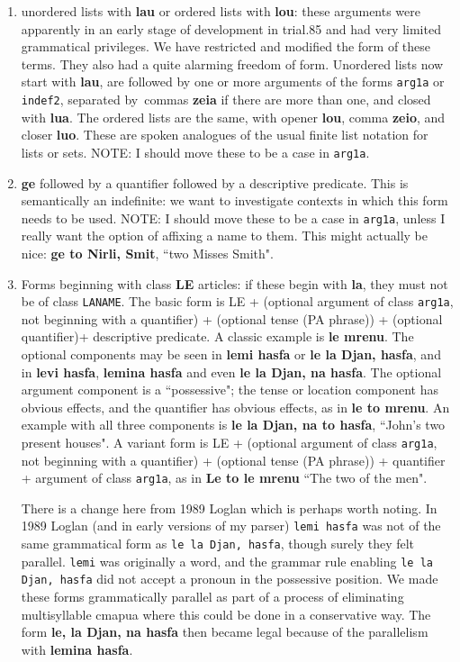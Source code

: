 \documentclass[12pt]{book}
\begin{document}
\begin{enumerate}

\item unordered lists with {\bf lau} or ordered lists with {\bf lou}:   these arguments were apparently in an early stage of development in trial.85 and had very limited grammatical privileges.  We have restricted and modified the form of these terms.  They also had a quite alarming freedom of form.  Unordered lists now start with {\bf lau}, are followed by one or more arguments of the forms {\tt arg1a} or {\tt indef2}, separated by\
commas {\bf zeia} if there are more than one, and closed with {\bf lua}.  The ordered lists are the same, with opener {\bf lou}, comma {\bf zeio}, and closer {\bf luo}.  These are spoken analogues of the usual finite list notation for lists or sets.  NOTE:  I should move these to be a case in {\tt arg1a}.


\item {\bf ge} followed by a quantifier followed by a descriptive predicate.  This is semantically an indefinite:  we want to  investigate contexts in which this form needs to be used.   NOTE:  I should move these to be a case in {\tt arg1a}, unless I really want the option of affixing a name to them.  This might actually be nice:  {\bf ge to Nirli, Smit}, ``two Misses Smith".

\item Forms beginning with class {\bf LE} articles:  if these begin with {\bf la}, they must not be of class {\tt LANAME}.  The basic form is LE + (optional argument of class {\tt arg1a}, not beginning with a quantifier) + (optional tense (PA phrase)) + (optional quantifier)+ descriptive predicate.  A classic example is {\bf le mrenu}.  The optional components may be seen in 
{\bf lemi hasfa} or {\bf le la Djan, hasfa}, and in {\bf levi hasfa}, {\bf lemina hasfa} and even {\bf le la Djan, na hasfa}.  The optional argument component is a ``possessive";  the tense or location component has obvious effects, and the quantifier has obvious effects, as in {\bf le to mrenu}.   An example with all three components is {\bf le la Djan, na to hasfa}, ``John's two present houses".  A variant form is LE + (optional argument of class {\tt arg1a}, not beginning with a quantifier) + (optional tense (PA phrase)) + quantifier + argument of class {\tt arg1a}, as in {\bf Le to le mrenu} ``The two of the men".

There is a change here from 1989 Loglan which is perhaps worth noting.  In 1989 Loglan (and in early versions of my parser) {\tt lemi hasfa} was not of the same grammatical form as
{\tt le la Djan, hasfa}, though surely they felt parallel.  {\tt lemi} was originally a word, and the grammar rule enabling {\tt le la Djan, hasfa} did not accept a pronoun in the possessive position.  We made these forms grammatically parallel as part of a process of eliminating multisyllable cmapua where this could be done in a conservative way.  The form
{\bf le, la Djan, na hasfa} then became legal because of the parallelism with {\bf lemina hasfa}.

\end{enumerate}
\end{document}
